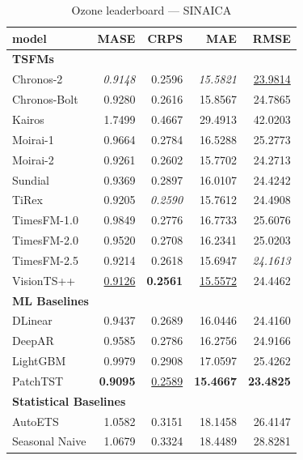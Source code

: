 \begin{table}[H]
\caption{Ozone leaderboard --- SINAICA}
\centering
\begin{small}
\begin{tabular}{lrrrr}
\toprule
model & MASE & CRPS & MAE & RMSE \\
\midrule
\multicolumn{5}{l}{\textbf{TSFMs}} \\
Chronos-2 & \textit{0.9148} & 0.2596 & \textit{15.5821} & \underline{23.9814} \\
Chronos-Bolt & 0.9280 & 0.2616 & 15.8567 & 24.7865 \\
Kairos & 1.7499 & 0.4667 & 29.4913 & 42.0203 \\
Moirai-1 & 0.9664 & 0.2784 & 16.5288 & 25.2773 \\
Moirai-2 & 0.9261 & 0.2602 & 15.7702 & 24.2713 \\
Sundial & 0.9369 & 0.2897 & 16.0107 & 24.4242 \\
TiRex & 0.9205 & \textit{0.2590} & 15.7612 & 24.4908 \\
TimesFM-1.0 & 0.9849 & 0.2776 & 16.7733 & 25.6076 \\
TimesFM-2.0 & 0.9520 & 0.2708 & 16.2341 & 25.0203 \\
TimesFM-2.5 & 0.9214 & 0.2618 & 15.6947 & \textit{24.1613} \\
VisionTS++ & \underline{0.9126} & \textbf{0.2561} & \underline{15.5572} & 24.4462 \\
\midrule
\multicolumn{5}{l}{\textbf{ML Baselines}} \\
DLinear & 0.9437 & 0.2689 & 16.0446 & 24.4160 \\
DeepAR & 0.9585 & 0.2786 & 16.2756 & 24.9166 \\
LightGBM & 0.9979 & 0.2908 & 17.0597 & 25.4262 \\
PatchTST & \textbf{0.9095} & \underline{0.2589} & \textbf{15.4667} & \textbf{23.4825} \\
\midrule
\multicolumn{5}{l}{\textbf{Statistical Baselines}} \\
AutoETS & 1.0582 & 0.3151 & 18.1458 & 26.4147 \\
Seasonal Naive & 1.0679 & 0.3324 & 18.4489 & 28.8281 \\
\bottomrule
\end{tabular}
\end{small}
\end{table}